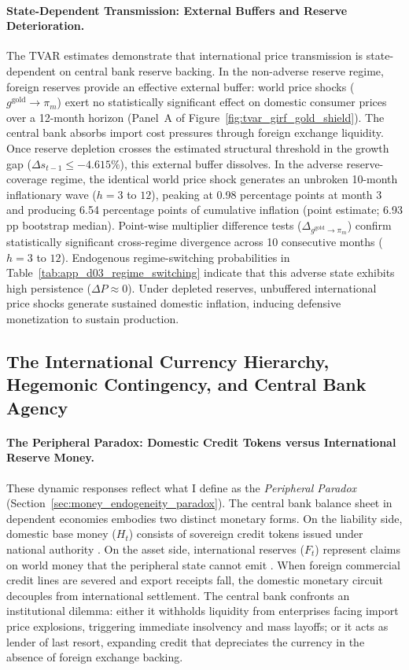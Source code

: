 \paragraph{State-Dependent Transmission: External Buffers and Reserve Deterioration.}
The TVAR estimates demonstrate that international price transmission is state-dependent on central bank reserve backing. In the non-adverse reserve regime, foreign reserves provide an effective external buffer: world price shocks ($g^{\text{gold}} \to \pi_m$) exert no statistically significant effect on domestic consumer prices over a 12-month horizon (Panel~A of Figure~\ref{fig:tvar_girf_gold_shield}). The central bank absorbs import cost pressures through foreign exchange liquidity. Once reserve depletion crosses the estimated structural threshold in the growth gap ($\Delta s_{t-1} \le -4.615\%$), this external buffer dissolves. In the adverse reserve-coverage regime, the identical world price shock generates an unbroken 10-month inflationary wave ($h=3$ to $12$), peaking at 0.98 percentage points at month 3 and producing 6.54 percentage points of cumulative inflation (point estimate; 6.93 pp bootstrap median). Point-wise multiplier difference tests ($\Delta_{g^{\text{gold}} \to \pi_m}$) confirm statistically significant cross-regime divergence across 10 consecutive months ($h=3$ to $12$). Endogenous regime-switching probabilities in Table~\ref{tab:app_d03_regime_switching} indicate that this adverse state exhibits high persistence ($\Delta P \approx 0$). Under depleted reserves, unbuffered international price shocks generate sustained domestic inflation, inducing defensive monetization to sustain production.

\subsection{The International Currency Hierarchy, Hegemonic Contingency, and Central Bank Agency}
\label{sec:currency_hierarchy_agency}

\paragraph{The Peripheral Paradox: Domestic Credit Tokens versus International Reserve Money.}
These dynamic responses reflect what I define as the \emph{Peripheral Paradox} (Section~\ref{sec:money_endogeneity_paradox}). The central bank balance sheet in dependent economies embodies two distinct monetary forms. On the liability side, domestic base money ($H_t$) consists of sovereign credit tokens issued under national authority \citep{Basu2022}. On the asset side, international reserves ($F_t$) represent claims on world money that the peripheral state cannot emit \citep{Vasudevan2009,AlamiEtAl2022}. When foreign commercial credit lines are severed and export receipts fall, the domestic monetary circuit decouples from international settlement. The central bank confronts an institutional dilemma: either it withholds liquidity from enterprises facing import price explosions, triggering immediate insolvency and mass layoffs; or it acts as lender of last resort, expanding credit that depreciates the currency in the absence of foreign exchange backing.

